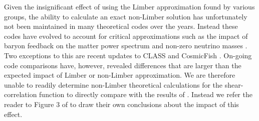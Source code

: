 Given the insignificant effect of using the Limber approximation found by various groups, the ability to calculate an exact non-Limber solution has unfortunately not been maintained in many theoretical codes over the years.  Instead these codes have evolved to account for critical approximations such as the impact of baryon feedback on the matter power spectrum and non-zero neutrino masses \citep[see for example][]{joudaki/etal:2016, mead/etal:2016}.    Two exceptions to this are recent updates to CLASS \citep{blas/lesgourgues/tram:2011,audren/etal:2013} and CosmicFish \citep{raveri/etal:2016}.  On-going code comparisons have, however, revealed differences that are larger than the expected impact of Limber or non-Limber approximation.   We are therefore unable to readily determine non-Limber theoretical calculations for the shear-correlation function to directly compare with the results of \citet{kitching/etal:2016}.   Instead we refer the reader to Figure 3 of \citet{giannantonio/etal:2012} to draw their own conclusions about the impact of this effect.



 
 
 
 
 
 
 